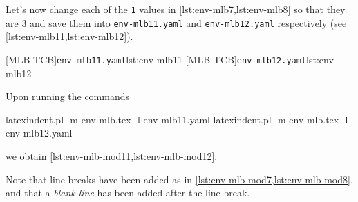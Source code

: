   \begin{example}
  Let's now change each of the \texttt{1} values in \cref{lst:env-mlb7,lst:env-mlb8} so
  that they are $3$ and save them into \texttt{env-mlb11.yaml} and
  \texttt{env-mlb12.yaml} respectively (see \cref{lst:env-mlb11,lst:env-mlb12}).

  \begin{cmhtcbraster}
   [MLB-TCB]{\texttt{env-mlb11.yaml}}{lst:env-mlb11}
   [MLB-TCB]{\texttt{env-mlb12.yaml}}{lst:env-mlb12}
  \end{cmhtcbraster}

  Upon running the commands

  \begin{commandshell}
latexindent.pl -m env-mlb.tex -l env-mlb11.yaml
latexindent.pl -m env-mlb.tex -l env-mlb12.yaml
\end{commandshell}

  we obtain \cref{lst:env-mlb-mod11,lst:env-mlb-mod12}.

  \begin{widepage}
   \begin{minipage}{.42\linewidth}
   \end{minipage}
   \hfill
   \begin{minipage}{.57\linewidth}
   \end{minipage}
  \end{widepage}

  Note that line breaks have been added as in \cref{lst:env-mlb-mod7,lst:env-mlb-mod8},
  and that a \emph{blank line} has been added after the line break.
  \end{example}

